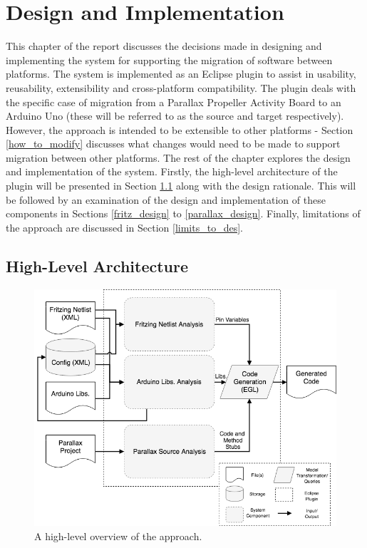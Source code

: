 \documentclass{UoYCSproject}
\begin{document}
\chapter{Design and Implementation} \label{design_and_impl}
This chapter of the report discusses the decisions made in designing and implementing the system for supporting the migration of software between platforms. The system is implemented as an Eclipse plugin to assist in usability, reusability, extensibility and cross-platform compatibility. The plugin deals with the specific case of migration from a Parallax Propeller Activity Board to an Arduino Uno (these will be referred to as the source and target respectively). However, the approach is intended to be extensible to other platforms - Section \ref{how_to_modify} discusses what changes would need to be made to support migration between other platforms. The rest of the chapter explores the design and implementation of the system. Firstly, the high-level architecture of the plugin will be presented in Section \ref{high_lev_arch} along with the design rationale. This will be followed by an examination of the design and implementation of these components in Sections \ref{fritz_design} to \ref{parallax_design}. Finally, limitations of the approach are discussed in Section \ref{limits_to_des}.

\section{High-Level Architecture} \label{high_lev_arch}
\begin{figure}[h!]
  \centering
  \includegraphics[width=0.8\linewidth]{graphics/high_level_overview.png}
  \caption{A high-level overview of the approach.}
  \label{fig:high_level_overview}
\end{figure}
\end{document}
